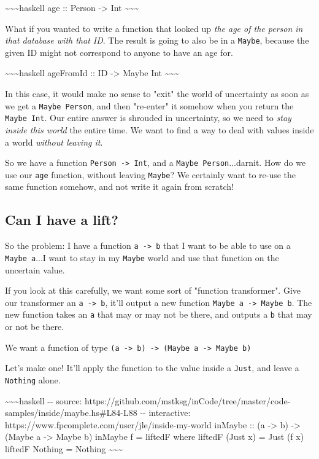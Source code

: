 \documentclass[]{article}
\begin{document}
\textasciitilde{}\textasciitilde{}\textasciitilde{}haskell age :: Person
-\textgreater{} Int \textasciitilde{}\textasciitilde{}\textasciitilde{}

What if you wanted to write a function that looked up \emph{the age of the
person in that database with that ID}. The result is going to also be in a
\texttt{Maybe}, because the given ID might not correspond to anyone to have an
age for.

\textasciitilde{}\textasciitilde{}\textasciitilde{}haskell ageFromId :: ID
-\textgreater{} Maybe Int \textasciitilde{}\textasciitilde{}\textasciitilde{}

In this case, it would make no sense to "exit" the world of uncertainty as soon
as we get a \texttt{Maybe\ Person}, and then "re-enter" it somehow when you
return the \texttt{Maybe\ Int}. Our entire answer is shrouded in uncertainty, so
we need to \emph{stay inside this world} the entire time. We want to find a way
to deal with values inside a world \emph{without leaving it}.

So we have a function \texttt{Person\ -\textgreater{}\ Int}, and a
\texttt{Maybe\ Person}...darnit. How do we use our \texttt{age} function,
without leaving \texttt{Maybe}? We certainly want to re-use the same function
somehow, and not write it again from scratch!

\subsection{Can I have a lift?}

So the problem: I have a function \texttt{a\ -\textgreater{}\ b} that I want to
be able to use on a \texttt{Maybe\ a}...I want to stay in my \texttt{Maybe}
world and use that function on the uncertain value.

If you look at this carefully, we want some sort of "function transformer". Give
our transformer an \texttt{a\ -\textgreater{}\ b}, it'll output a new function
\texttt{Maybe\ a\ -\textgreater{}\ Maybe\ b}. The new function takes an
\texttt{a} that may or may not be there, and outputs a \texttt{b} that may or
not be there.

We want a function of type
\texttt{(a\ -\textgreater{}\ b)\ -\textgreater{}\ (Maybe\ a\ -\textgreater{}\ Maybe\ b)}

Let's make one! It'll apply the function to the value inside a \texttt{Just},
and leave a \texttt{Nothing} alone.

\textasciitilde{}\textasciitilde{}\textasciitilde{}haskell -\/- source:
https://github.com/mstksg/inCode/tree/master/code-samples/inside/maybe.hs\#L84-L88
-\/- interactive: https://www.fpcomplete.com/user/jle/inside-my-world inMaybe ::
(a -\textgreater{} b) -\textgreater{} (Maybe a -\textgreater{} Maybe b) inMaybe
f = liftedF where liftedF (Just x) = Just (f x) liftedF Nothing = Nothing
\textasciitilde{}\textasciitilde{}\textasciitilde{}
\end{document}
